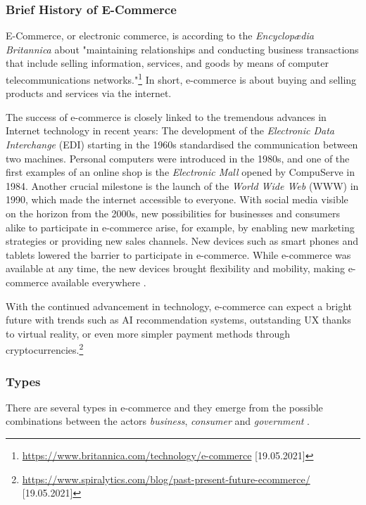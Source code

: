 \subsubsection{Brief History of E-Commerce}

E-Commerce, or electronic commerce, is according to the \textit{Encyclopædia Britannica} about "maintaining relationships and conducting business transactions that include selling information, services, and goods by means of computer telecommunications networks."\footnote{\url{https://www.britannica.com/technology/e-commerce} [19.05.2021]}
In short, e-commerce is about buying and selling products and services via the internet.


The success of e-commerce is closely linked to the tremendous advances in Internet technology in recent years:
The development of the \textit{Electronic Data Interchange} (EDI) starting in the 1960s standardised the communication between two machines.
Personal computers were introduced in the 1980s, and one of the first examples of an online shop is the \textit{Electronic Mall} opened by CompuServe in 1984.
Another crucial milestone is the launch of the \textit{World Wide Web} (WWW) in 1990, which made the internet accessible to everyone.
With social media visible on the horizon from the 2000s, new possibilities for businesses and consumers alike to participate in e-commerce arise, for example, by enabling new marketing strategies or providing new sales channels.
New devices such as smart phones and tablets lowered the barrier to participate in e-commerce.
While e-commerce was available at any time, the new devices brought flexibility and mobility, making e-commerce available everywhere \cite{2019Hermogeno}.

With the continued advancement in technology, e-commerce can expect a bright future with trends such as AI recommendation systems, outstanding UX thanks to virtual reality, or even more simpler payment methods through cryptocurrencies.\footnote{\url{https://www.spiralytics.com/blog/past-present-future-ecommerce/} [19.05.2021]}



\subsubsection{Types}

There are several types in e-commerce and they emerge from the possible combinations between the actors \textit{business}, \textit{consumer} and \textit{government} \cite{2017DosSantos}.

